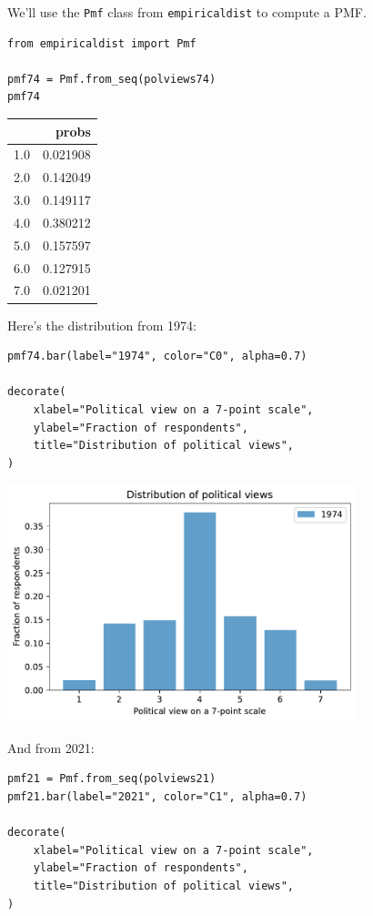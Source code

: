 We'll use the \passthrough{\lstinline!Pmf!} class from
\passthrough{\lstinline!empiricaldist!} to compute a PMF.

\begin{lstlisting}[]
from empiricaldist import Pmf

pmf74 = Pmf.from_seq(polviews74)
pmf74
\end{lstlisting}

\begin{tabular}{lr}
\midrule
{} &     probs \\
\midrule
1.0 &  0.021908 \\
2.0 &  0.142049 \\
3.0 &  0.149117 \\
4.0 &  0.380212 \\
5.0 &  0.157597 \\
6.0 &  0.127915 \\
7.0 &  0.021201 \\
\midrule
\end{tabular}

Here's the distribution from 1974:

\begin{lstlisting}[]
pmf74.bar(label="1974", color="C0", alpha=0.7)

decorate(
    xlabel="Political view on a 7-point scale",
    ylabel="Fraction of respondents",
    title="Distribution of political views",
)
\end{lstlisting}

\begin{center}
\includegraphics[width=4in]{chapters/02_polviews_files/02_polviews_32_0.pdf}
\end{center}

And from 2021:

\begin{lstlisting}[]
pmf21 = Pmf.from_seq(polviews21)
pmf21.bar(label="2021", color="C1", alpha=0.7)

decorate(
    xlabel="Political view on a 7-point scale",
    ylabel="Fraction of respondents",
    title="Distribution of political views",
)
\end{lstlisting}

